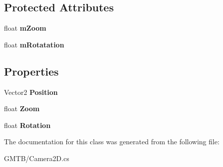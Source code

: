 \subsection*{Protected Attributes}
\begin{DoxyCompactItemize}
\item 
\mbox{\label{class_g_m_t_b_1_1_camera2_d_ad5869ee15ab0d881798f442498a53bc4}} 
float {\bfseries m\+Zoom}
\item 
\mbox{\label{class_g_m_t_b_1_1_camera2_d_a57f0ffcfb3653654a0273fd7e74cece8}} 
float {\bfseries m\+Rotatation}
\end{DoxyCompactItemize}
\subsection*{Properties}
\begin{DoxyCompactItemize}
\item 
\mbox{\label{class_g_m_t_b_1_1_camera2_d_a66225af24a142ff19e20f060b1c93f1d}} 
Vector2 {\bfseries Position}
\item 
\mbox{\label{class_g_m_t_b_1_1_camera2_d_a8636897096114e1720df04da44a78ba5}} 
float {\bfseries Zoom}
\item 
\mbox{\label{class_g_m_t_b_1_1_camera2_d_afaebc443efa1ddf0f97eeb4e30f97ced}} 
float {\bfseries Rotation}
\end{DoxyCompactItemize}


The documentation for this class was generated from the following file\+:\begin{DoxyCompactItemize}
\item 
G\+M\+T\+B/Camera2\+D.\+cs\end{DoxyCompactItemize}

